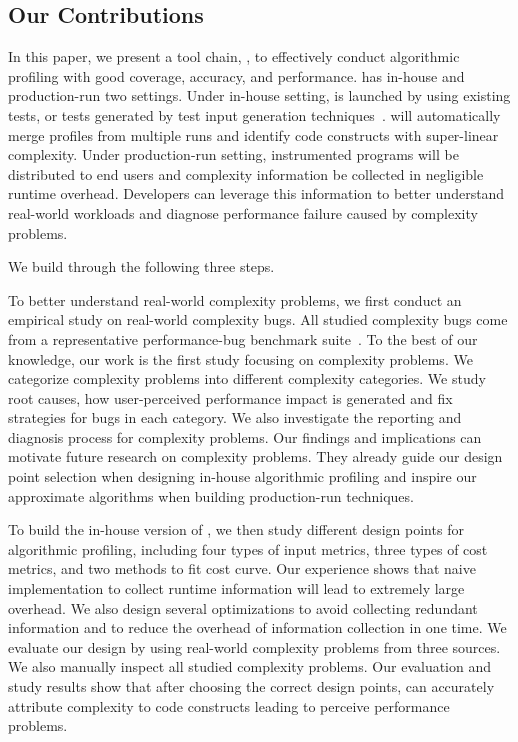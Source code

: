 \subsection{Our Contributions}
\label{sec:con}


In this paper, 
we present a tool chain, \Tool, to effectively conduct algorithmic profiling with 
good coverage, accuracy, and performance. 
\Tool has in-house and production-run two settings. 
Under in-house setting, 
\Tool is launched by using existing tests, 
or tests generated by test input generation techniques~\cite{KLEE,s2e,dart,EventBreak}. 
\Tool will automatically merge profiles from multiple runs and 
identify code constructs with super-linear complexity. 
Under production-run setting, 
instrumented programs will be distributed to end users 
and complexity information be collected in negligible runtime overhead. 
Developers can leverage this information to better understand real-world workloads
and diagnose performance failure caused by complexity problems. 

We build \Tool through the following three steps.

To better understand real-world complexity problems,
we first conduct an empirical study on real-world complexity bugs.
All studied complexity bugs come from a representative 
performance-bug benchmark suite~\cite{PerfBug,SongOOPSLA2014}.
To the best of our knowledge, our work is the first study focusing on complexity problems.
We categorize complexity problems into different complexity categories.
We study root causes, 
how user-perceived performance impact is generated 
and fix strategies for bugs in each category. 
We also investigate the reporting and diagnosis process for complexity problems.
Our findings and implications can motivate future research on complexity problems. 
They already guide our design point selection when designing in-house algorithmic profiling 
and inspire our approximate algorithms when building production-run techniques. 

To build the in-house version of \Tool, 
we then study different design points for algorithmic profiling,
including four types of input metrics, three types of cost metrics, 
and two methods to fit cost curve. 
Our experience shows that naive implementation 
to collect runtime information
will lead to extremely large overhead. 
We also design several optimizations to avoid collecting redundant information
and to reduce the overhead of information collection in one time.
We evaluate our design by using real-world complexity problems from three sources.
We also manually inspect all studied complexity problems. 
Our evaluation and study results show that after choosing the correct design points, 
\Tool can accurately attribute complexity to code constructs 
leading to perceive performance problems. 





